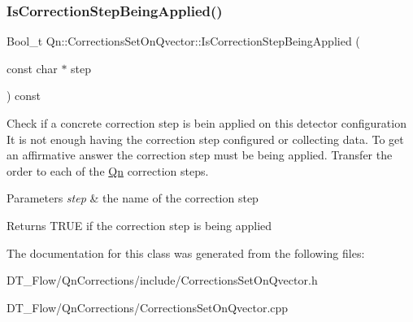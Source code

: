 \subsubsection{\texorpdfstring{Is\+Correction\+Step\+Being\+Applied()}{IsCorrectionStepBeingApplied()}}
{\footnotesize\ttfamily Bool\+\_\+t Qn\+::\+Corrections\+Set\+On\+Qvector\+::\+Is\+Correction\+Step\+Being\+Applied (\begin{DoxyParamCaption}\item[{const char $\ast$}]{step }\end{DoxyParamCaption}) const}

Check if a concrete correction step is bein applied on this detector configuration It is not enough having the correction step configured or collecting data. To get an affirmative answer the correction step must be being applied. Transfer the order to each of the \mbox{\hyperlink{namespaceQn}{Qn}} correction steps. 
\begin{DoxyParams}{Parameters}
{\em step} & the name of the correction step \\
\hline
\end{DoxyParams}
\begin{DoxyReturn}{Returns}
T\+R\+UE if the correction step is being applied 
\end{DoxyReturn}


The documentation for this class was generated from the following files\+:\begin{DoxyCompactItemize}
\item 
D\+T\+\_\+\+Flow/\+Qn\+Corrections/include/Corrections\+Set\+On\+Qvector.\+h\item 
D\+T\+\_\+\+Flow/\+Qn\+Corrections/Corrections\+Set\+On\+Qvector.\+cpp\end{DoxyCompactItemize}

